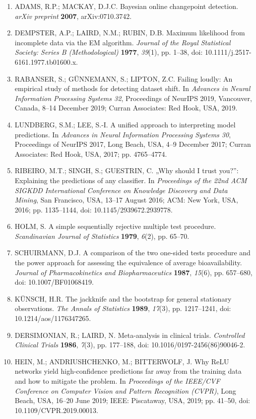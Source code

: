 \documentclass[12pt,a4paper]{article}
\begin{document}
{\begin{enumerate}[label=\arabic*.,leftmargin=1cm,labelsep=0.25cm,itemsep=0pt,parsep=0pt,topsep=2pt,align=left]
\item ADAMS, R.P.; MACKAY, D.J.C. Bayesian online changepoint detection. \textit{arXiv preprint} \textbf{2007}, arXiv:0710.3742.
\item DEMPSTER, A.P.; LAIRD, N.M.; RUBIN, D.B. Maximum likelihood from incomplete data via the EM algorithm. \textit{Journal of the Royal Statistical Society: Series B (Methodological)} \textbf{1977}, \textit{39}(1), pp. 1–38, doi: 10.1111/j.2517-6161.1977.tb01600.x.
\item RABANSER, S.; GÜNNEMANN, S.; LIPTON, Z.C. Failing loudly: An empirical study of methods for detecting dataset shift. In \textit{Advances in Neural Information Processing Systems 32}, Proceedings of NeurIPS 2019, Vancouver, Canada, 8–14 December 2019; Curran Associates: Red Hook, USA, 2019.
\item LUNDBERG, S.M.; LEE, S.-I. A unified approach to interpreting model predictions. In \textit{Advances in Neural Information Processing Systems 30}, Proceedings of NeurIPS 2017, Long Beach, USA, 4–9 December 2017; Curran Associates: Red Hook, USA, 2017; pp. 4765–4774.
\item RIBEIRO, M.T.; SINGH, S.; GUESTRIN, C. „Why should I trust you?”: Explaining the predictions of any classifier. In \textit{Proceedings of the 22nd ACM SIGKDD International Conference on Knowledge Discovery and Data Mining}, San Francisco, USA, 13–17 August 2016; ACM: New York, USA, 2016; pp. 1135–1144, doi: 10.1145/2939672.2939778.
\item HOLM, S. A simple sequentially rejective multiple test procedure. \textit{Scandinavian Journal of Statistics} \textbf{1979}, \textit{6}(2), pp. 65–70.
\item SCHUIRMANN, D.J. A comparison of the two one-sided tests procedure and the power approach for assessing the equivalence of average bioavailability. \textit{Journal of Pharmacokinetics and Biopharmaceutics} \textbf{1987}, \textit{15}(6), pp. 657–680, doi: 10.1007/BF01068419.
\item KÜNSCH, H.R. The jackknife and the bootstrap for general stationary observations. \textit{The Annals of Statistics} \textbf{1989}, \textit{17}(3), pp. 1217–1241, doi: 10.1214/aos/1176347265.
\item DERSIMONIAN, R.; LAIRD, N. Meta-analysis in clinical trials. \textit{Controlled Clinical Trials} \textbf{1986}, \textit{7}(3), pp. 177–188, doi: 10.1016/0197-2456(86)90046-2.
\item HEIN, M.; ANDRIUSHCHENKO, M.; BITTERWOLF, J. Why ReLU networks yield high-confidence predictions far away from the training data and how to mitigate the problem. In \textit{Proceedings of the IEEE/CVF Conference on Computer Vision and Pattern Recognition (CVPR)}, Long Beach, USA, 16–20 June 2019; IEEE: Piscataway, USA, 2019; pp. 41–50, doi: 10.1109/CVPR.2019.00013.

\end{enumerate}}
\end{document}
